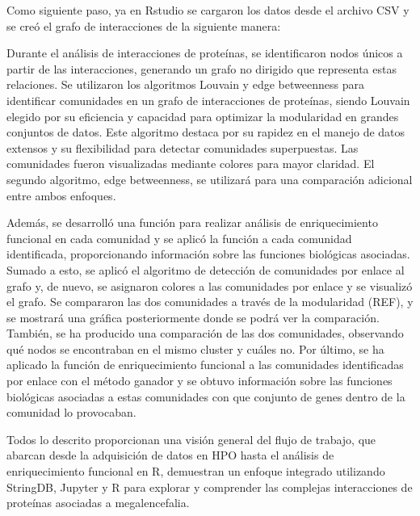Como siguiente paso, ya en Rstudio se cargaron los datos desde el archivo CSV y se creó el grafo de interacciones de la siguiente manera:

Durante el análisis de interacciones de proteínas, se identificaron nodos únicos a partir de las interacciones, generando un grafo no dirigido que representa estas relaciones. Se utilizaron los algoritmos Louvain \cite{louvain} y edge betweenness \cite{cluster_edge_betweenness} para identificar comunidades en un grafo de interacciones de proteínas, siendo Louvain elegido por su eficiencia y capacidad para optimizar la modularidad en grandes conjuntos de datos. Este algoritmo destaca por su rapidez en el manejo de datos extensos y su flexibilidad para detectar comunidades superpuestas. Las comunidades fueron visualizadas mediante colores para mayor claridad. El segundo algoritmo, edge betweenness, se utilizará para una comparación adicional entre ambos enfoques.

Además, se desarrolló una función para realizar análisis de enriquecimiento funcional en cada comunidad y se aplicó la función a cada comunidad identificada, proporcionando información sobre las funciones biológicas asociadas. Sumado a esto, se aplicó el algoritmo de detección de comunidades por enlace al grafo y, de nuevo, se asignaron colores a las comunidades por enlace y se visualizó el grafo. Se compararon las dos comunidades a través de la modularidad (REF), y se mostrará una gráfica posteriormente donde se podrá ver la comparación. También, se ha producido una comparación de las dos comunidades, observando qué nodos se encontraban en el mismo cluster y cuáles no. Por último, se ha aplicado la función de enriquecimiento funcional a las comunidades identificadas por enlace con el método ganador y se obtuvo información sobre las funciones biológicas asociadas a estas comunidades con que conjunto de genes dentro de la comunidad lo provocaban.

Todos lo descrito proporcionan una visión general del flujo de trabajo, que abarcan desde la adquisición de datos en HPO hasta el análisis de enriquecimiento funcional en R, demuestran un enfoque integrado utilizando StringDB, Jupyter y R para explorar y comprender las complejas interacciones de proteínas asociadas a megalencefalia.



